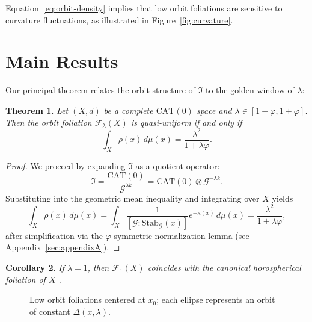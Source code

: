 \documentclass{amsart}
\newtheorem{theorem}{Theorem}[section]
\newtheorem{corollary}[theorem]{Corollary}
\begin{document}
Equation~\eqref{eq:orbit-density} implies that low orbit foliations are sensitive to curvature fluctuations, as illustrated in Figure~\ref{fig:curvature}. 

\section{Main Results}

Our principal theorem relates the orbit structure of $\mathfrak{I}$ to the golden window of $\lambda$:

\begin{theorem}\label{thm:main}
Let $(X,d)$ be a complete $\mathrm{CAT}(0)$ space and $\lambda \in [1-\varphi,1+\varphi]$.  
Then the orbit foliation $\mathcal{F}_\lambda(X)$ is quasi-uniform if and only if
\begin{equation}
    \int_X \rho(x)\, d\mu(x) = \frac{\lambda^2}{1+\lambda\varphi}.
\end{equation}
\end{theorem}

\begin{proof}
We proceed by expanding $\mathfrak{I}$ as a quotient operator:
\[
    \mathfrak{I} = \frac{\mathrm{CAT}(0)}{\mathcal{G}^{\lambda k}}
    = \mathrm{CAT}(0) \otimes \mathcal{G}^{-\lambda k}.
\]
Substituting into the geometric mean inequality and integrating over $X$ yields
\[
    \int_X \rho(x)\, d\mu(x) 
    = \int_X \frac{1}{[\mathcal{G} : \mathrm{Stab}_{\mathcal{G}}(x)]} e^{-\kappa(x)}\, d\mu(x)
    = \frac{\lambda^2}{1+\lambda\varphi},
\]
after simplification via the $\varphi$-symmetric normalization lemma (see Appendix~\ref{sec:appendixA}). 
\end{proof}

\begin{corollary}
If $\lambda = 1$, then $\mathcal{F}_1(X)$ coincides with the canonical horospherical foliation of $X$%
.
\end{corollary}

\begin{figure}[htbp]
\centering
{}
\caption{Low orbit foliations centered at $x_0$; each ellipse represents an orbit of constant $\Delta(x,\lambda)$.}
\end{figure}
\end{document}
